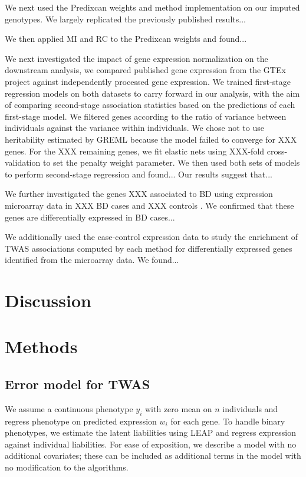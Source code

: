 \documentclass{article}
\begin{document}
We next used the Predixcan weights and method implementation on our imputed
genotypes. We largely replicated the previously published results...

We then applied MI and RC to the Predixcan weights and found...

We next investigated the impact of gene expression normalization on the
downstream analysis, we compared published gene expression from the GTEx
project against independently processed gene expression. We trained first-stage
regression models on both datasets to carry forward in our analysis, with the
aim of comparing second-stage association statistics based on the predictions
of each first-stage model. We filtered genes according to the ratio of variance
between individuals against the variance within individuals. We chose not to
use heritability estimated by GREML\cite{10.1016/j.ajhg.2010.11.011} because
the model failed to converge for XXX genes. For the XXX remaining genes, we fit
elastic nets using XXX-fold cross-validation to set the penalty weight
parameter. We then used both sets of models to perform second-stage regression
and found... Our results suggest that...

We further investigated the genes XXX associated to BD using expression
microarray data in XXX BD cases and XXX controls \cite{xxx}. We confirmed that
these genes are differentially expressed in BD cases...

We additionally used the case-control expression data to study the enrichment
of TWAS associations computed by each method for differentially expressed genes
identified from the microarray data. We found...

\section{Discussion}

\section{Methods}

\subsection{Error model for TWAS}

We assume a continuous phenotype $y_i$ with zero mean on $n$ individuals and
regress phenotype on predicted expression $w_i$ for each gene. To handle binary
phenotypes, we estimate the latent liabilities using
LEAP\cite{10.1038/nmeth.3285} and regress expression against individual
liabilities. For ease of exposition, we describe a model with no additional
covariates; these can be included as additional terms in the model with no
modification to the algorithms.
\end{document}
